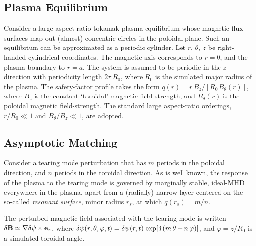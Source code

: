 \documentclass[12pt,prb,aps]{revtex4-1}
\begin{document}
\subsection{Plasma Equilibrium}
Consider a large aspect-ratio tokamak plasma equilibrium whose magnetic flux-surfaces map out
(almost) concentric circles in the poloidal plane. Such an equilibrium can be approximated as a
periodic cylinder.\cite{rf1993} Let $r$, $\theta$, $z$ be right-handed cylindrical coordinates. 
The magnetic axis corresponds to $r=0$, and the plasma boundary to $r=a$. The system is assumed to be periodic in the $z$
direction with periodicity length $2\pi\,R_0$, where $R_0$ is the simulated major radius of the plasma. The
safety-factor profile takes the form $q(r)=r\,B_z/[R_0\,B_\theta(r)]$, where $B_z$ is the constant
`toroidal' magnetic field-strength, and $B_\theta(r)$ is the poloidal magnetic field-strength. The standard
large aspect-ratio orderings, $r/R_0\ll 1$ and $B_\theta/B_z\ll 1$, are adopted. 

\subsection{Asymptotic Matching}\label{cyl}
Consider a tearing mode perturbation that has $m$ periods in the poloidal direction, and
$n$ periods in the toroidal direction. 
As is well known, the response of the plasma to the tearing mode is
governed by marginally stable, ideal-MHD everywhere in the plasma, apart from a (radially) narrow
layer centered on the so-called {\em resonant surface}, minor radius $r_s$, at which $q(r_s)=m/n$.\cite{fkr}

The perturbed magnetic field associated with the tearing mode is written $\delta{\bf B} \simeq \nabla\delta\psi\times{\bf e}_z$,  
where
$\delta\psi(r,\theta,\varphi,t)= \delta\psi(r,t)\,\exp[\,{\rm i}\,(m\,\theta-n\,\varphi)]$, 
and $\varphi=z/R_0$ is a simulated toroidal angle. 
\end{document}
